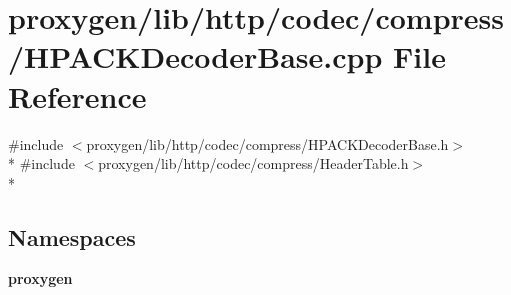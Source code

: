 \section{proxygen/lib/http/codec/compress/\+H\+P\+A\+C\+K\+Decoder\+Base.cpp File Reference}
\label{HPACKDecoderBase_8cpp}
{\ttfamily \#include $<$proxygen/lib/http/codec/compress/\+H\+P\+A\+C\+K\+Decoder\+Base.\+h$>$}\\*
{\ttfamily \#include $<$proxygen/lib/http/codec/compress/\+Header\+Table.\+h$>$}\\*
\subsection*{Namespaces}
\begin{DoxyCompactItemize}
\item 
 {\bf proxygen}
\end{DoxyCompactItemize}
